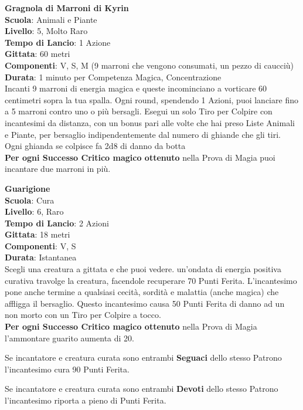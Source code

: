 \begin{multicols}{2}
\medskip\textbf{Gragnola di Marroni di Kyrin}\\
\textbf{Scuola}: Animali e Piante\\
\textbf{Livello}: 5, Molto Raro\\
\textbf{Tempo di Lancio}: 1 Azione\\
\textbf{Gittata}: 60 metri\\
\textbf{Componenti}: V, S, M (9 marroni che vengono consumati, un pezzo di caucciù)\\
\textbf{Durata}: 1 minuto per Competenza Magica, Concentrazione\\
Incanti 9 marroni di energia magica e queste incominciano a vorticare 60 centimetri sopra la tua spalla.
Ogni round, spendendo 1 Azioni, puoi lanciare fino a 5 marroni contro uno o più bersagli. Esegui un solo Tiro per Colpire con incantesimi da distanza, con un bonus pari alle volte che hai preso Liste Animali e Piante, per bersaglio indipendentemente dal numero di ghiande che gli tiri. Ogni ghianda se colpisce fa 2d8 di danno da botta\\
\textbf{Per ogni Successo Critico magico ottenuto} nella Prova di Magia puoi incantare due marroni in più.

\medskip\textbf{Guarigione}\\
\textbf{Scuola}: Cura\\
\textbf{Livello}: 6, Raro\\
\textbf{Tempo di Lancio}: 2 Azioni\\
\textbf{Gittata}: 18 metri\\
\textbf{Componenti}: V, S\\
\textbf{Durata}: Istantanea\\
Scegli una creatura a gittata e che puoi vedere. un'ondata di energia positiva curativa travolge la creatura, facendole recuperare 70 Punti Ferita. L'incantesimo pone anche termine a qualsiasi cecità, sordità e malattia (anche magica) che affligga il bersaglio. Questo incantesimo causa 50 Punti Ferita di danno ad un non morto con un Tiro per Colpire a tocco.\\
\textbf{Per ogni Successo Critico magico ottenuto} nella Prova di Magia l'ammontare guarito aumenta di 20.

Se incantatore e creatura curata sono entrambi \textbf{Seguaci} dello stesso Patrono l'incantesimo cura 90 Punti Ferita.

Se incantatore e creatura curata sono entrambi \textbf{Devoti} dello stesso Patrono l'incantesimo riporta a pieno di Punti Ferita.


\end{multicols}
